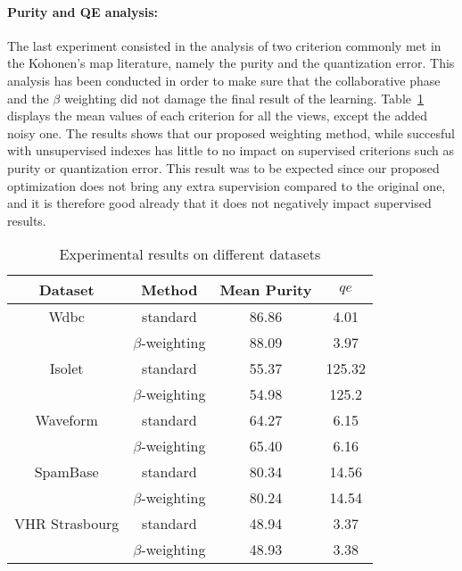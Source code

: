\paragraph{Purity and QE analysis:}
The last experiment consisted in the analysis of two criterion commonly met in the Kohonen's map literature, namely the purity and the quantization error. This analysis has been conducted in order to make sure that the collaborative phase and the $\beta$ weighting did not damage the final result of the learning. Table~\ref{tab:criterion} displays the mean values of each criterion for all the views, except the added noisy one. The results shows that our proposed weighting method, while succesful with unsupervised indexes has little to no impact on supervised criterions such as purity or quantization error. This result was to be expected since our proposed optimization does not bring any extra supervision compared to the original one, and it is therefore good already that it does not negatively impact supervised results.

\begin{table}[!h]
	\caption{Experimental results on different datasets}
\label{tab:criterion}
	\begin{center}
				\begin{tabular}{cccc}
			\toprule
			Dataset 	& Method 			& Mean Purity  & $qe$
			\\ 			\midrule
						Wdbc		& standard  		& 86.86 & 4.01  \\
						& $\beta$-weighting  	& 88.09 & 3.97  \\ \midrule 
			Isolet 		& standard    		& 55.37 & 125.32 \\
						& $\beta$-weighting    & 54.98 & 125.2 \\ \midrule 
			Waveform    & standard     		& 64.27 & 6.15  \\
						& $\beta$-weighting    & 65.40 & 6.16  \\ \midrule 
			SpamBase    & standard     		& 80.34 & 14.56 \\ 
						& $\beta$-weighting    & 80.24 & 14.54 \\ \midrule
			VHR Strasbourg    & standard     		& 48.94 & 3.37 \\ 
						& $\beta$-weighting    & 48.93 & 3.38 \\ \bottomrule
		\end{tabular}
	\end{center}
\end{table}




